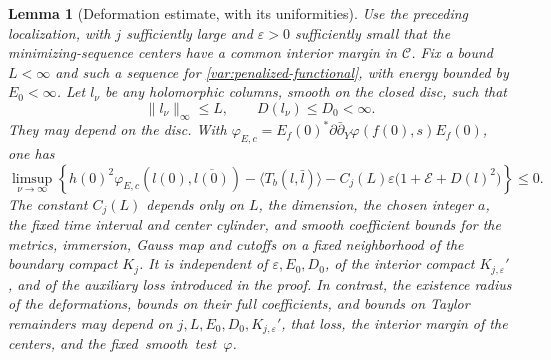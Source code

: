 \documentclass[11pt]{article}
\newtheorem{lemma}[theorem]{Lemma}
\theoremstyle{definition}
\theoremstyle{remark}
\newcommand{\dd}{\partial\bar\partial}
\newcommand{\eps}{\varepsilon}
\numberwithin{equation}{section}
\begin{document}
\begin{lemma}[Deformation estimate, with its uniformities]
\label{lem:disc-deformation}
Use the preceding localization, with $j$ sufficiently large and
$\eps>0$ sufficiently small that the minimizing-sequence centers have
a common interior margin in $\mathcal C$.  Fix a bound $L<\infty$
and such a sequence for \eqref{var:penalized-functional}, with energy
bounded by $E_0<\infty$.  Let $l_\nu$ be any holomorphic columns, smooth on the
closed disc, such that
\[
 \|l_\nu\|_\infty\le L,\qquad D(l_\nu)\le D_0<\infty.
\]
They may depend on the disc.  With
$\varphi_{E,c}=E_f(0)^*\dd_Y\varphi(f(0),s)E_f(0)$, one has
\begin{equation}
 \limsup_{\nu\to\infty}
 \left\{
 h(0)^2\varphi_{E,c}(l(0),\overline{l(0)})
 -\langle T_b(l,\bar l)\rangle
 -C_j(L)\eps\bigl(1+\mathcal E+D(l)^2\bigr)
 \right\}\le0.
 \label{var:deformation-estimate}
\end{equation}
The constant $C_j(L)$ depends only on $L$, the dimension, the chosen
integer $a$, the fixed time interval and center cylinder, and smooth
coefficient bounds for the metrics, immersion, Gauss map and cutoffs
on a fixed neighborhood of the boundary compact $K_j$.
It is independent of $\eps,E_0,D_0$, of the interior
compact $K_{j,\eps}'$, and of the auxiliary loss introduced in the proof.
In contrast, the existence radius of the deformations, bounds on their
full coefficients, and bounds on Taylor remainders may depend on
$j,L,E_0,D_0,K_{j,\eps}'$, that loss, the interior margin of the
centers, and the fixed~smooth~test~$\varphi$.
\end{lemma}
\end{document}
